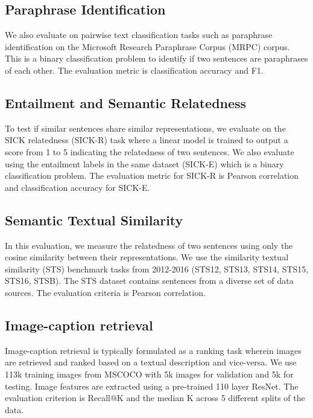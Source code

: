 \documentclass{article} \usepackage{iclr2018_conference,times}
\begin{document}
\subsection{Paraphrase Identification} We also evaluate on pairwise text classification tasks such as paraphrase identification on the Microsoft Research Paraphrase Corpus (MRPC) corpus. This is a binary classification problem to identify if two sentences are paraphrases of each other. The evaluation metric is classification accuracy and F1. 

\subsection{Entailment and Semantic Relatedness}
To test if similar sentences share similar representations, we evaluate on the SICK relatedness (SICK-R) task where a linear model is trained to output a score from 1 to 5 indicating the relatedness of two sentences. We also evaluate using the entailment labels in the same dataset (SICK-E) which is a binary classification problem. The evaluation metric for SICK-R is Pearson correlation and classification accuracy for SICK-E.

\subsection{Semantic Textual Similarity}
In this evaluation, we measure the relatedness of two sentences using only the cosine similarity between their representations. We use the similarity textual similarity (STS) benchmark tasks from 2012-2016 (STS12, STS13, STS14, STS15, STS16, STSB). The STS dataset contains sentences from a diverse set of data sources. The evaluation criteria is Pearson correlation.

\subsection{Image-caption retrieval}
Image-caption retrieval is typically formulated as a ranking task wherein images are retrieved and ranked based on a textual description and vice-versa. We use 113k training images from MSCOCO with 5k images for validation and 5k for testing. Image features are extracted using a pre-trained 110 layer ResNet. The evaluation criterion is Recall@K and the median K across 5 different splits of the data.
\end{document}
